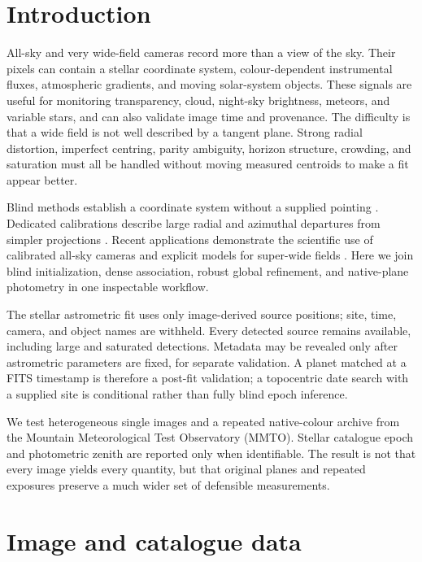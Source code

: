 \documentclass{aa}
\begin{document}
\section{Introduction}
\label{sec:introduction}

All-sky and very wide-field cameras record more than a view of the sky. Their
pixels can contain a stellar coordinate system, colour-dependent instrumental
fluxes, atmospheric gradients, and moving solar-system objects. These signals
are useful for monitoring transparency, cloud, night-sky brightness, meteors,
and variable stars, and can also validate image time and provenance. The
difficulty is that a wide field is not well described by a tangent plane.
Strong radial distortion, imperfect centring, parity ambiguity, horizon
structure, crowding, and saturation must all be handled without moving
measured centroids to make a fit appear better.

Blind methods establish a coordinate system without a supplied pointing
\citep{Lang2010}. Dedicated calibrations describe large radial and azimuthal
departures from simpler projections
\citep{borovicka1995,Barghini2019,Jeanne2019}. Recent applications demonstrate
the scientific use of calibrated all-sky cameras \citep{Hung2024,Yin2025} and
explicit models for super-wide fields \citep{AntunaSanchez2022,Yang2025}.
Here we join blind initialization, dense association, robust global refinement,
and native-plane photometry in one inspectable workflow.

The stellar astrometric fit uses only image-derived source positions; site, time,
camera, and object names are withheld. Every detected source remains available,
including large and saturated detections. Metadata may be revealed only after
astrometric parameters are fixed, for separate validation. A planet matched at a FITS
timestamp is therefore a post-fit validation; a topocentric date search with a
supplied site is conditional rather than fully blind epoch inference.

We test heterogeneous single images and a repeated native-colour archive from
the Mountain Meteorological Test Observatory (MMTO). Stellar catalogue epoch
and photometric zenith are reported only when identifiable. The result is not
that every image yields every quantity, but that original planes and repeated
exposures preserve a much wider set of defensible measurements.

\section{Image and catalogue data}
\label{sec:data}
\end{document}
